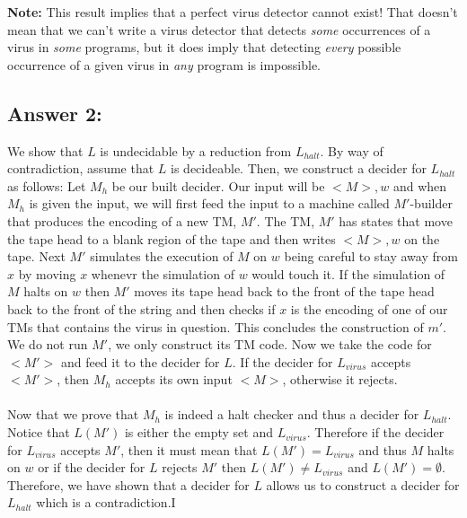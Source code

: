 \documentclass[12pt]{article}
\begin{document}
\textbf{Note:}  This result implies that a perfect virus detector cannot exist! That doesn't mean that we can't write a virus detector that detects \emph{some} occurrences of a virus in \emph{some} programs, but it does imply that detecting \emph{every} possible occurrence of a given virus  in \emph{any} program is impossible.

\subsection*{Answer 2:}
We show that $L$ is undecidable by a reduction from $L_{halt}$. By way of contradiction, assume that $L$ is decideable. Then, we construct a decider for $L_{halt}$ as follows: Let $M_h$ be our built decider. Our input will be $<M>, w$ and when $M_h$ is given the input, we will first feed the input to a machine called $M'$-builder that produces the encoding of a new TM, $M'$. The TM, $M'$ has states that move the tape head to a blank region of the tape and then writes $<M>, w$ on the tape. Next $M'$ simulates the execution of $M$ on $w$ being careful to stay away from $x$ by moving $x$ whenevr the simulation of $w$ would touch it. If the simulation of $M$ halts on $w$ then $M'$ moves its tape head back to the front of the tape head back to the front of the string 
and then checks if $x$ is the encoding of one of our TMs that contains the virus in question. This concludes the construction of $m'$. We do not run $M'$, we only construct its TM code. Now we take the code for $<M'>$ and feed it to the decider for $L$. If the decider for $L_{virus}$ accepts $<M'>$, then $M_h$ accepts its own input $<M>$, otherwise it rejects.\\\\
Now that we prove that $M_h$ is indeed a halt checker and thus a decider for $L_{halt}$. Notice that $L(M')$ is either the empty set and $L_{virus}$. Therefore if the decider for $L_{virus}$ accepts $M'$, then it must mean that $L(M')= L_{virus}$ and thus $M$ halts on $w$ or if the decider for $L$ rejects $M'$ then $L(M')\neq L_{virus}$ and $L(M') = \emptyset$. Therefore, we have shown that a decider for $L$ allows us to construct a decider for $L_{halt}$ which is a contradiction.I
\end{document}
